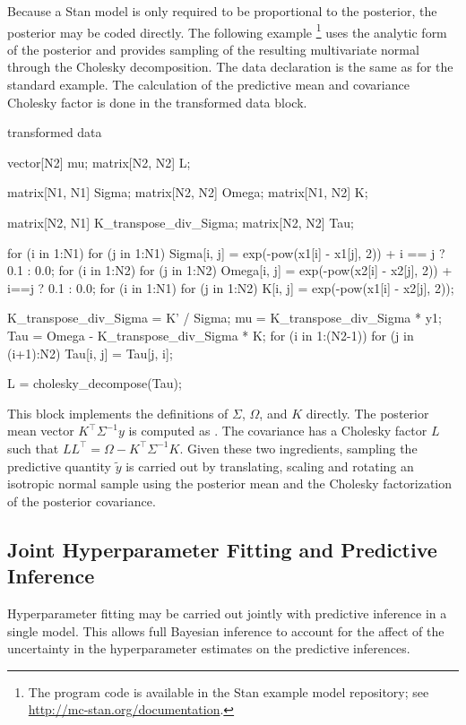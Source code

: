 Because a Stan model is only required to be proportional to the
posterior, the posterior may be coded directly.  The following
example%
%
\footnote{The program code is available in the Stan example model repository;
see \url{http://mc-stan.org/documentation}.}
%
uses the analytic form of the posterior and provides sampling of the
resulting multivariate normal through the Cholesky decomposition.
The data declaration is the same as for the standard example.  The
calculation of the predictive mean  and covariance Cholesky
factor  is done in the transformed data block.
%
\begin{stancode}
transformed data {
  vector[N2] mu;
  matrix[N2, N2] L;
  { 
    matrix[N1, N1] Sigma;
    matrix[N2, N2] Omega;
    matrix[N1, N2] K;
    
    matrix[N2, N1] K_transpose_div_Sigma;
    matrix[N2, N2] Tau;

    for (i in 1:N1) 
      for (j in 1:N1)
        Sigma[i, j] = exp(-pow(x1[i] - x1[j], 2)) 
          + i == j ? 0.1 : 0.0;
    for (i in 1:N2) 
      for (j in 1:N2)
        Omega[i, j] = exp(-pow(x2[i] - x2[j], 2)) 
          + i==j ? 0.1 : 0.0; 
    for (i in 1:N1)
      for (j in 1:N2)
        K[i, j] = exp(-pow(x1[i] - x2[j], 2));
    
    K_transpose_div_Sigma = K' / Sigma;
    mu = K_transpose_div_Sigma * y1; 
    Tau = Omega - K_transpose_div_Sigma * K;
    for (i in 1:(N2-1))
      for (j in (i+1):N2)
        Tau[i, j] = Tau[j, i];

    L = cholesky_decompose(Tau);
  }
}
\end{stancode}
%
This block implements the definitions of $\Sigma$, $\Omega$, and $K$
directly.  The posterior mean vector $K^{\top}\Sigma^{-1}y$ is
computed as .  The covariance has a Cholesky factor $L$ such
that $LL^{\top} = \Omega - K^{\top}\Sigma^{-1}K$.  Given these two
ingredients, sampling the predictive quantity $\tilde{y}$ is carried
out by translating, scaling and rotating an isotropic normal sample 
using the posterior mean and the Cholesky factorization of the
posterior covariance.


\subsection{Joint Hyperparameter Fitting and Predictive Inference}

Hyperparameter fitting may be carried out jointly with predictive
inference in a single model.  This allows full Bayesian inference to
account for the affect of the uncertainty in the hyperparameter
estimates on the predictive inferences.  

